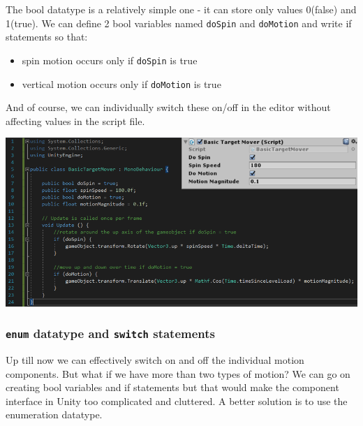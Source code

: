 \documentclass{article}[a4paper,12pt]
\theoremstyle{definition}
\begin{document}
The bool datatype is a relatively simple one - it can store only values 0(false) and 1(true). We can define 2 bool variables named \texttt{doSpin} and \texttt{doMotion} and write if statements so that:
\begin{itemize}
	\item spin motion occurs only if \texttt{doSpin} is true
	\item vertical motion occurs only if \texttt{doMotion} is true
\end{itemize}
And of course, we can individually switch these on/off in the editor without affecting values in the script file.
\begin{center}\includegraphics[width=\textwidth]{basic_target_mover_bool.png}\end{center}
\subsubsection{\texttt{enum} datatype and \texttt{switch} statements}
Up till now we can effectively switch on and off the individual motion components. But what if we have more than two types of motion? We can go on creating bool variables and if statements but that would make the component interface in Unity too complicated and cluttered. A better solution is to use the enumeration datatype.
\vspace{6pt} 
\end{document}
